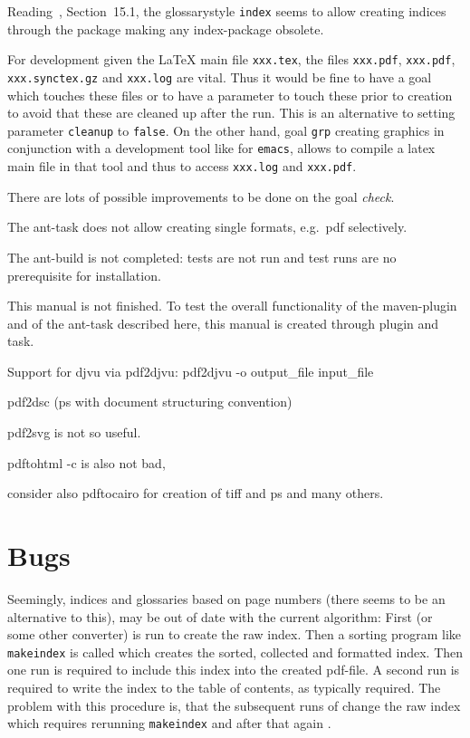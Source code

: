 \documentclass[a4paper,12pt]{book}
\begin{document}
Reading~\cite{GloP}, Section~15.1, the glossarystyle \texttt{index} 
seems to allow creating indices through the  package 
making any index-package obsolete. 

For development given the \LaTeX{} main file \texttt{xxx.tex}, 
the files \texttt{xxx.pdf}, \texttt{xxx.pdf}, \texttt{xxx.synctex.gz} 
and \texttt{xxx.log} are vital. 
Thus it would be fine to have a goal which touches these files 
or to have a parameter to touch these prior to creation 
to avoid that these are cleaned up after the run. 
This is an alternative to setting parameter \texttt{cleanup} to \texttt{false}. 
On the other hand, goal \texttt{grp} creating graphics 
in conjunction with a development tool like \auctex{} for \texttt{emacs}, 
allows to compile a latex main file in that tool 
and thus to access \texttt{xxx.log} and \texttt{xxx.pdf}. 

There are lots of possible improvements to be done on the goal \emph{check}. 


The ant-task does not allow creating single formats, e.g.~pdf selectively. 

The ant-build is not completed: tests are not run and 
test runs are no prerequisite for installation. 

This manual is not finished. 
To test the overall functionality of the maven-plugin and of the ant-task 
described here, this manual is created through plugin and task. 

Support for djvu via pdf2djvu: 
pdf2djvu -o output\_file input\_file

pdf2dsc
(ps with document structuring convention) 

pdf2svg is not so useful. 

pdftohtml -c is also not bad, 

consider also pdftocairo for creation of tiff and ps and many others. 

\chapter{Bugs}\label{chap:bugs}

Seemingly, indices and glossaries based on page numbers 
(there seems to be an alternative to this), 
may be out of date with the current algorithm: 
First \lualatex{} (or some other converter) is run to create the raw index. 
Then a sorting program like \texttt{makeindex} is called 
which creates the sorted, collected and formatted index. 
Then one \lualatex{} run is required to include this index 
into the created pdf-file. 
A second \lualatex{} run is required 
to write the index to the table of contents, as typically required. 
The problem with this procedure is, 
that the subsequent runs of \lualatex{} change the raw index 
which requires rerunning \texttt{makeindex} 
and after that again \lualatex. 
\end{document}
